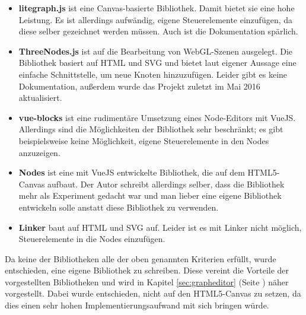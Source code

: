 \begin{itemize}
    \item \textbf{litegraph.js} ist eine Canvas-basierte Bibliothek. Damit bietet sie eine hohe Leistung. Es ist allerdings aufwändig, eigene Steuerelemente einzufügen, da diese selber gezeichnet werden müssen. Auch ist die Dokumentation spärlich. \cite{litegraph}
    \item \textbf{ThreeNodes.js} ist auf die Bearbeitung von WebGL-Szenen ausgelegt. Die Bibliothek basiert auf HTML und SVG und bietet laut eigener Aussage eine einfache Schnittstelle, um neue Knoten hinzuzufügen. Leider gibt es keine Dokumentation, außerdem wurde das Projekt zuletzt im Mai 2016 aktualisiert. \cite{threenodes}
    \item \textbf{vue-blocks} ist eine rudimentäre Umsetzung eines Node-Editors mit VueJS. Allerdings sind die Möglichkeiten der Bibliothek sehr beschränkt; es gibt beispielsweise keine Möglichkeit, eigene Steuerelemente in den Nodes anzuzeigen. \cite{vueblocks}
    \item \textbf{Nodes} ist eine mit VueJS entwickelte Bibliothek, die auf dem HTML5-Canvas aufbaut. Der Autor schreibt allerdings selber, dass die Bibliothek mehr als Experiment gedacht war und man lieber eine eigene Bibliothek entwickeln solle anstatt diese Bibliothek zu verwenden. \cite{nodes}
    \item \textbf{Linker} baut auf HTML und SVG auf. Leider ist es mit Linker nicht möglich, Steuerelemente in die Nodes einzufügen. \cite{linker}
\end{itemize}

Da keine der Bibliotheken alle der oben genannten Kriterien erfüllt, wurde entschieden, eine eigene Bibliothek zu schreiben. Diese vereint die Vorteile der vorgestellten Bibliotheken und wird in Kapitel \ref{sec:grapheditor} (Seite \pageref{sec:grapheditor}) näher vorgestellt. Dabei wurde entschieden, nicht auf den HTML5-Canvas zu setzen, da dies einen sehr hohen Implementierungsaufwand mit sich bringen würde.
